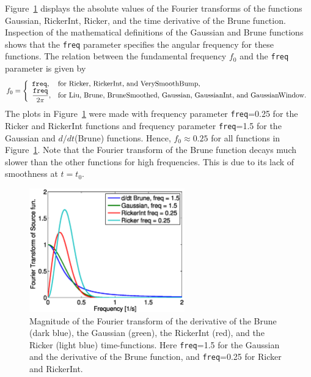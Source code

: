 \documentclass[11pt]{report}
\begin{document}
Figure~\ref{fig:fouriers} displays the absolute values of the Fourier transforms of the
functions Gaussian, RickerInt, Ricker, and the time derivative of the Brune
function. Inspection of the mathematical definitions of the Gaussian and Brune functions
shows that the {\tt freq} parameter specifies the angular frequency for these
functions. The relation between the fundamental frequency $f_0$ and the {\tt freq} parameter is
given by
\begin{equation}\label{eq:angular-scaling}
f_0 = \left\{ \begin{array}{ll}
 {\tt freq},& \mbox{for Ricker, RickerInt, and VerySmoothBump},\\
 \dfrac{\tt freq}{2\pi},& \mbox{for Liu, Brune, BruneSmoothed, Gaussian, GaussianInt, and GaussianWindow}.
\end{array}\right.
\end{equation}
The plots in Figure~\ref{fig:fouriers} were made with frequency parameter {\tt freq}=0.25 for the
Ricker and RickerInt functions and frequency parameter {\tt freq}=1.5 for the Gaussian and
$d/dt$(Brune) functions. Hence, $f_0\approx 0.25$ for all functions in
Figure~\ref{fig:fouriers}. Note that the Fourier
transform of the Brune function decays much slower than the other functions for high
frequencies. This is due to its lack of smoothness at $t=t_0$.
\begin{figure}
\begin{center}
\includegraphics[width=0.6\textwidth]{figfouriers.ps}
\caption{ Magnitude of the Fourier transform of the derivative of the Brune (dark
  blue), the Gaussian (green), the RickerInt (red), and the Ricker (light blue)
  time-functions. Here {\tt freq}=1.5 for the Gaussian and the derivative of the Brune
  function, and {\tt freq}=0.25 for Ricker and RickerInt.}
\label{fig:fouriers}
\end{center}
\end{figure}
\end{document}
